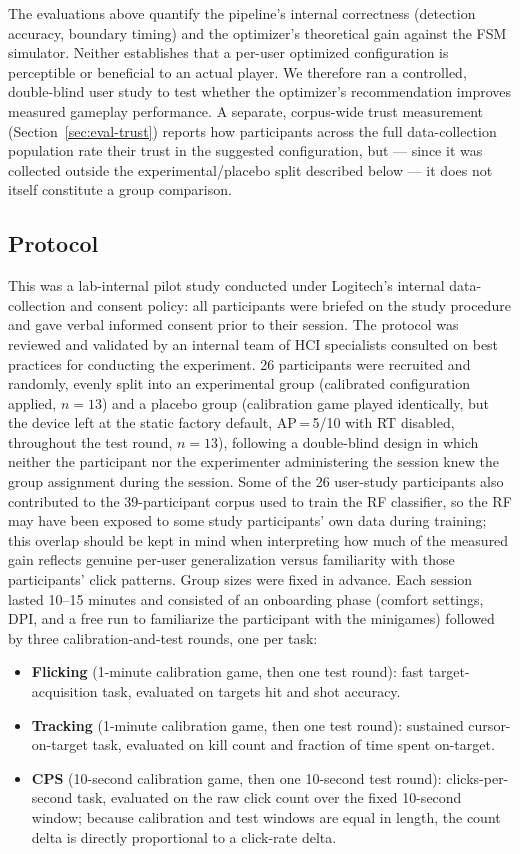 The evaluations above quantify the pipeline's internal correctness (detection
accuracy, boundary timing) and the optimizer's theoretical gain against the FSM
simulator. Neither establishes that a per-user optimized configuration is
perceptible or beneficial to an actual player. We therefore ran a controlled,
double-blind user study to test whether the optimizer's recommendation improves
measured gameplay performance. A separate, corpus-wide trust measurement
(Section~\ref{sec:eval-trust}) reports how participants across the full data-collection
population rate their trust in the suggested configuration, but --- since it
was collected outside the experimental/placebo split described below --- it
does not itself constitute a group comparison.

\subsection{Protocol}
This was a lab-internal pilot study conducted under Logitech's internal
data-collection and consent policy: all participants were briefed on the
study procedure and gave verbal informed consent prior to their session. The
protocol was reviewed and validated by an internal team of HCI specialists
consulted on best practices for conducting the experiment.
26 participants were recruited and randomly, evenly split into an experimental
group (calibrated configuration applied, $n=13$) and a placebo group (calibration
game played identically, but the device left at the static factory default,
AP\,=\,5/10 with RT disabled, throughout the test round, $n=13$), following a
double-blind design in which neither the participant nor the experimenter
administering the session knew the group assignment during the session. Some
of the 26 user-study participants also contributed to the 39-participant
corpus used to train the RF classifier, so the RF may have been exposed to
some study participants' own data during training; this overlap should be
kept in mind when interpreting how much of the measured gain reflects
genuine per-user generalization versus familiarity with those participants'
click patterns.
Group sizes were fixed in advance. Each session lasted
10--15 minutes and consisted of an onboarding phase (comfort settings, DPI, and a
free run to familiarize the participant with the minigames) followed by three
calibration-and-test rounds, one per task:

\begin{itemize}
  \item \textbf{Flicking} (1-minute calibration game, then one test round):
    fast target-acquisition task, evaluated on targets hit and shot accuracy.
  \item \textbf{Tracking} (1-minute calibration game, then one test round):
    sustained cursor-on-target task, evaluated on kill count and fraction of
    time spent on-target.
  \item \textbf{CPS} (10-second calibration game, then one 10-second test round):
    clicks-per-second task, evaluated on the raw click count over the fixed
    10-second window; because calibration and test windows are equal in
    length, the count delta is directly proportional to a click-rate delta.
\end{itemize}

